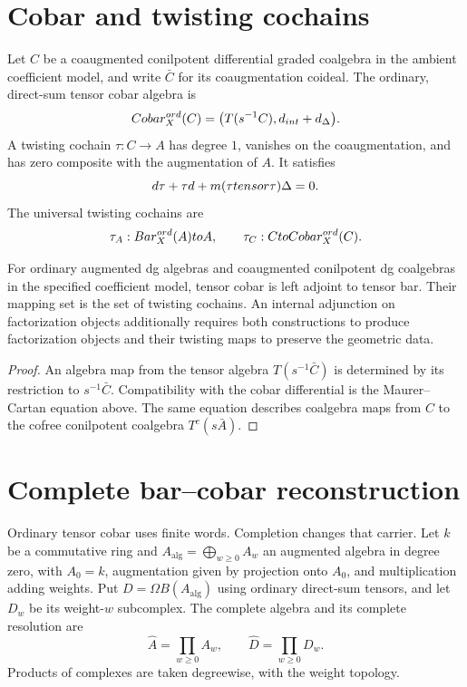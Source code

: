 \section{Cobar and twisting cochains}
Let $C$ be a coaugmented conilpotent differential graded coalgebra in the ambient
coefficient model, and write $\bar C$ for its coaugmentation coideal.
The ordinary, direct-sum tensor cobar algebra is
\[
 Cobar_X^{ord}(C)=
 \bigl(T(s^{-1}C),d_{int}+d_\Delta\bigr).
\]
A twisting cochain $\tau:C\to A$ has degree $1$, vanishes on the coaugmentation,
and has zero composite with the augmentation of $A$. It satisfies
\[
 d\tau+\tau d+m(\tau tensor\tau)\Delta=0.
\]
The universal twisting cochains are
\[
 \tau_A:Bar_X^{ord}(A)to A,
 \qquad
 \tau_C:CtoCobar_X^{ord}(C).
\]

\begin{theorem}
For ordinary augmented dg algebras and coaugmented conilpotent dg coalgebras
in the specified coefficient model, tensor cobar is left adjoint to tensor bar.
Their mapping set is the set of twisting cochains.
An internal adjunction on factorization objects additionally requires both constructions
to produce factorization objects and their twisting maps to preserve the geometric data.
\end{theorem}
\begin{proof}
An algebra map from the tensor algebra $T(s^{-1}\bar C)$ is determined by its restriction to $s^{-1}\bar C$. Compatibility with the cobar differential is the Maurer--Cartan equation above. The same equation describes coalgebra maps from $C$ to the cofree conilpotent coalgebra $T^c(s\bar A)$.
\end{proof}

\section{Complete bar--cobar reconstruction}
Ordinary tensor cobar uses finite words. Completion changes that carrier.
Let $k$ be a commutative ring and
$A_{\mathrm{alg}}=\bigoplus_{w\ge0}A_w$ an augmented algebra in degree zero,
with $A_0=k$, augmentation given by projection onto $A_0$, and multiplication adding weights.
Put $D=\Omega B(A_{\mathrm{alg}})$ using ordinary direct-sum tensors,
and let $D_w$ be its weight-$w$ subcomplex.
The complete algebra and its complete resolution are
\[
 \widehat A=\prod_{w\ge0}A_w,\qquad
 \widehat D=\prod_{w\ge0}D_w.
\]
Products of complexes are taken degreewise, with the weight topology.

